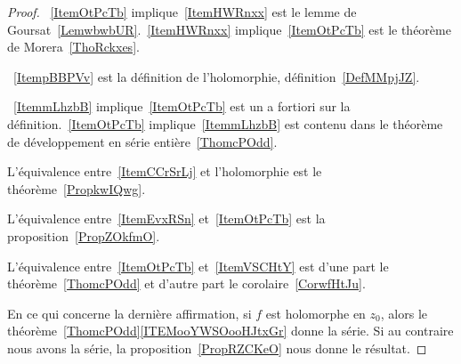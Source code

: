 \begin{proof}
	~\ref{ItemOtPcTb} implique~\ref{ItemHWRnxx} est le lemme de Goursat~\ref{LemwbwbUR}.~\ref{ItemHWRnxx} implique~\ref{ItemOtPcTb} est le théorème de Morera~\ref{ThoRckxes}.

	~\ref{ItempBBPVv} est la définition de l'holomorphie, définition~\ref{DefMMpjJZ}.

	~\ref{ItemmLhzbB} implique~\ref{ItemOtPcTb} est un a fortiori sur la définition.~\ref{ItemOtPcTb} implique~\ref{ItemmLhzbB} est contenu dans le théorème de développement en série entière~\ref{ThomcPOdd}.

	L'équivalence entre~\ref{ItemCCrSrLj} et l'holomorphie est le théorème~\ref{PropkwIQwg}.

	L'équivalence entre~\ref{ItemEvxRSn} et~\ref{ItemOtPcTb} est la proposition~\ref{PropZOkfmO}.

	L'équivalence entre~\ref{ItemOtPcTb} et~\ref{ItemVSCHtY} est d'une part le théorème~\ref{ThomcPOdd} et d'autre part le corolaire~\ref{CorwfHtJu}.

	En ce qui concerne la dernière affirmation, si \( f\) est holomorphe en \( z_0\), alors le théorème~\ref{ThomcPOdd}\ref{ITEMooYWSOooHJtxGr} donne la série. Si au contraire nous avons la série, la proposition~\ref{PropRZCKeO} nous donne le résultat.
\end{proof}
